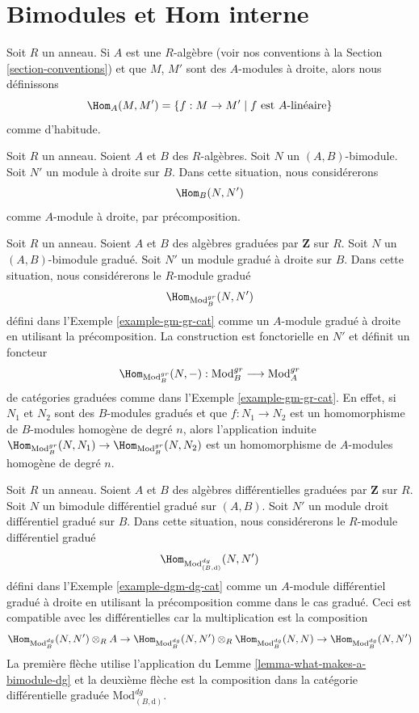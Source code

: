 \section{Bimodules et Hom interne}
\label{section-bimodules-hom}

\noindent
Soit $R$ un anneau. Si $A$ est une $R$-algèbre (voir nos conventions à la Section
\ref{section-conventions}) et que $M$, $M'$ sont des $A$-modules à droite, alors
nous définissons
$$
\Hom_A(M, M') = \{f : M \to M' \mid f \text{ est }A\text{-linéaire}\}
$$
comme d'habitude.

\medskip\noindent
Soit $R$ un anneau. Soient $A$ et $B$ des $R$-algèbres. Soit $N$ un $(A,
B)$-bimodule. Soit $N'$ un module à droite sur $B$. Dans cette situation, nous
considérerons
$$
\Hom_B(N, N')
$$
comme $A$-module à droite, par précomposition.

\medskip\noindent
Soit $R$ un anneau. Soient $A$ et $B$ des algèbres graduées par $\mathbf{Z}$ sur $R$. Soit
$N$ un $(A, B)$-bimodule gradué. Soit $N'$ un module gradué à droite sur $B$. Dans
cette situation, nous considérerons le $R$-module gradué
$$
\Hom_{\text{Mod}^{gr}_B}(N, N')
$$
défini dans l'Exemple \ref{example-gm-gr-cat} comme un $A$-module gradué à
droite en utilisant la précomposition. La construction est fonctorielle en $N'$ et
définit un foncteur
$$
\Hom_{\text{Mod}^{gr}_B}(N, -) :
\text{Mod}^{gr}_B
\longrightarrow
\text{Mod}^{gr}_A
$$
de catégories graduées comme dans l'Exemple \ref{example-gm-gr-cat}. En effet, si
$N_1$ et $N_2$ sont des $B$-modules gradués et que $f : N_1 \to N_2$ est un
homomorphisme de $B$-modules homogène de degré $n$, alors l'application induite
$\Hom_{\text{Mod}^{gr}_B}(N, N_1) \to \Hom_{\text{Mod}^{gr}_B}(N, N_2)$ est un
homomorphisme de $A$-modules homogène de degré $n$.

\medskip\noindent
Soit $R$ un anneau. Soient $A$ et $B$ des algèbres différentielles graduées par $\mathbf{Z}$
sur $R$. Soit $N$ un bimodule différentiel gradué sur $(A, B)$. Soit $N'$ un
module droit différentiel gradué sur $B$. Dans cette situation, nous considérerons
le $R$-module différentiel gradué
$$
\Hom_{\text{Mod}^{dg}_{(B, \text{d})}}(N, N')
$$
défini dans l'Exemple \ref{example-dgm-dg-cat} comme un $A$-module différentiel
gradué à droite en utilisant la précomposition comme dans le cas gradué. Ceci est
compatible avec les différentielles car la multiplication est la composition
$$
\Hom_{\text{Mod}^{dg}_B}(N, N') \otimes_R A \to
\Hom_{\text{Mod}^{dg}_B}(N, N') \otimes_R
\Hom_{\text{Mod}^{dg}_B}(N, N) \to
\Hom_{\text{Mod}^{dg}_B}(N, N')
$$
La première flèche utilise l'application du Lemme
\ref{lemma-what-makes-a-bimodule-dg} et la deuxième flèche est la composition dans
la catégorie différentielle graduée $\text{Mod}^{dg}_{(B, \text{d})}$.

